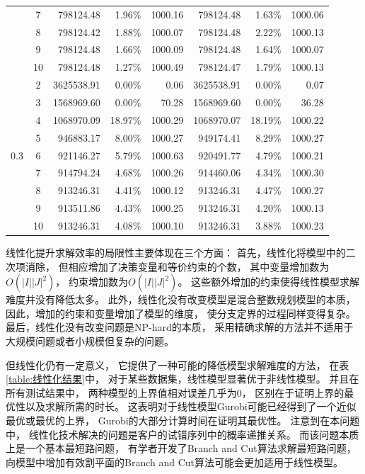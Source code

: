 {\begin{longtable}{ccrrrrrr}
			& 7     & 798124.48 & 1.96\% & 1000.16 & 798124.48 & 1.63\% & 1000.06 \\
			& 8     & 798124.42 & 1.88\% & 1000.07 & 798124.48 & 2.22\% & 1000.13 \\
			& 9     & 798124.48 & 1.66\% & 1000.09 & 798124.48 & 1.64\% & 1000.07 \\
			& 10    & 798124.48 & 1.27\% & 1000.49 & 798124.47 & 1.79\% & 1000.13 \\
			& 2     & 3625538.91 & 0.00\% & 0.06  & 3625538.91 & 0.00\% & 0.07 \\
			& 3     & 1568969.60 & 0.00\% & 70.28 & 1568969.60 & 0.00\% & 36.28 \\
			& 4     & 1068970.09 & 18.97\% & 1000.29 & 1068970.07 & 18.19\% & 1000.22 \\
			& 5     & 946883.17 & 8.00\% & 1000.27 & 949174.41 & 8.29\% & 1000.27 \\
	  0.3   & 6     & 921146.27 & 5.79\% & 1000.63 & 920491.77 & 4.79\% & 1000.21 \\
			& 7     & 914794.24 & 4.68\% & 1000.26 & 914460.06 & 4.34\% & 1000.30 \\
			& 8     & 913246.31 & 4.41\% & 1000.12 & 913246.31 & 4.47\% & 1000.27 \\
			& 9     & 913511.86 & 4.43\% & 1000.25 & 913246.31 & 4.20\% & 1000.13 \\
			& 10    & 913246.31 & 4.08\% & 1000.10 & 913246.31 & 3.88\% & 1000.23 \\

  
	\bottomrule %
\end{longtable}
}


线性化提升求解效率的局限性主要体现在三个方面：
首先，线性化将模型中的二次项消除，
但相应增加了决策变量和等价约束的个数，
其中变量增加数为$O(|I||J|^2)$，
约束增加数为$O(|I||J|^2)$。
这些额外增加的约束使得线性模型求解难度并没有降低太多。
此外，线性化没有改变模型是混合整数规划模型的本质，
因此，增加的约束和变量增加了模型的维度，
使分支定界的过程同样变得复杂。
最后，线性化没有改变问题是NP-hard的本质，
采用精确求解的方法并不适用于大规模问题或者小规模但复杂的问题。

但线性化仍有一定意义，
它提供了一种可能的降低模型求解难度的方法，
在表\ref{table:线性化结果}中，
对于某些数据集，线性模型显著优于非线性模型。
并且在所有测试结果中，
两种模型的上界值相对误差几乎为0，
区别在于证明上界的最优性以及求解所需的时长。
这表明对于线性模型Gurobi可能已经得到了一个近似最优或最优的上界，
Gurobi的大部分计算时间在证明其最优性。
注意到在本问题中，
线性化技术解决的问题是客户的试错序列中的概率递推关系。
而该问题本质上是一个基本最短路问题，
有学者\cite{jepsen}开发了Branch and Cut算法求解最短路问题，
向模型中增加有效割平面的Branch and Cut算法可能会更加适用于线性模型。


